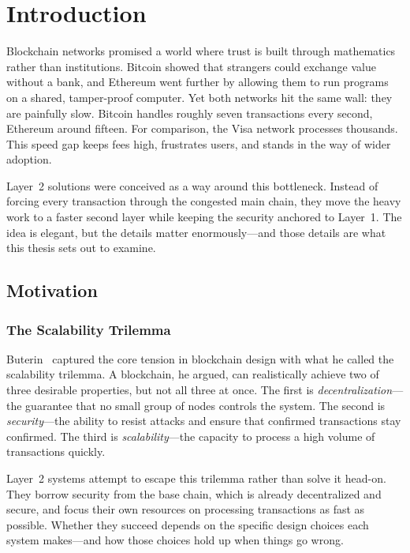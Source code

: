 \chapter{Introduction}
\label{ch:intro}

Blockchain networks promised a world where trust is built through mathematics rather than institutions. Bitcoin showed that strangers could exchange value without a bank, and Ethereum went further by allowing them to run programs on a shared, tamper-proof computer. Yet both networks hit the same wall: they are painfully slow. Bitcoin handles roughly seven transactions every second, Ethereum around fifteen. For comparison, the Visa network processes thousands. This speed gap keeps fees high, frustrates users, and stands in the way of wider adoption.

Layer~2 solutions were conceived as a way around this bottleneck. Instead of forcing every transaction through the congested main chain, they move the heavy work to a faster second layer while keeping the security anchored to Layer~1. The idea is elegant, but the details matter enormously---and those details are what this thesis sets out to examine.

\section{Motivation}

\subsection{The Scalability Trilemma}

Buterin~\cite{scalability-trilemma} captured the core tension in blockchain design with what he called the scalability trilemma. A blockchain, he argued, can realistically achieve two of three desirable properties, but not all three at once. The first is \textit{decentralization}---the guarantee that no small group of nodes controls the system. The second is \textit{security}---the ability to resist attacks and ensure that confirmed transactions stay confirmed. The third is \textit{scalability}---the capacity to process a high volume of transactions quickly.

Layer~2 systems attempt to escape this trilemma rather than solve it head-on. They borrow security from the base chain, which is already decentralized and secure, and focus their own resources on processing transactions as fast as possible. Whether they succeed depends on the specific design choices each system makes---and how those choices hold up when things go wrong.


